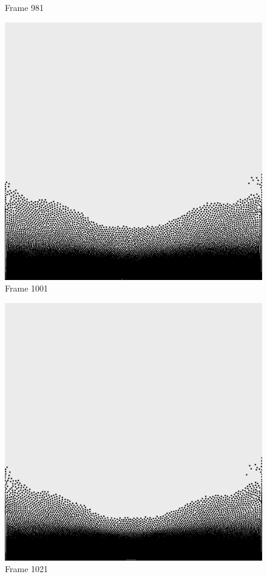\documentclass[a4paper, 12pt, oneside]{book}
\begin{document}
\begin{figure}[!ht]
\begin{center}
            Frame 981
        \end{center}
    \endminipage
    \hfill
        \begin{center}
            \includegraphics[width=\linewidth]{images/test_case_1/1001.png}
            Frame 1001
        \end{center}
    \endminipage
    \hfill
        \begin{center}
            \includegraphics[width=\linewidth]{images/test_case_1/1021.png}
            Frame 1021
        \end{center}
    \endminipage
    \hfill


\end{figure}
\end{document}
